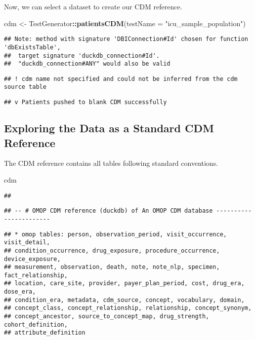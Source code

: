 \documentclass[
]{article}
\newenvironment{Shaded}{\begin{snugshade}}{\end{snugshade}}
\newcommand{\AttributeTok}[1]{\textcolor[rgb]{0.13,0.29,0.53}{#1}}
\newcommand{\FunctionTok}[1]{\textcolor[rgb]{0.13,0.29,0.53}{\textbf{#1}}}
\newcommand{\NormalTok}[1]{#1}
\newcommand{\OtherTok}[1]{\textcolor[rgb]{0.56,0.35,0.01}{#1}}
\newcommand{\SpecialCharTok}[1]{\textcolor[rgb]{0.81,0.36,0.00}{\textbf{#1}}}
\newcommand{\StringTok}[1]{\textcolor[rgb]{0.31,0.60,0.02}{#1}}
\begin{document}
Now, we can select a dataset to create our CDM reference.

\begin{Shaded}
\begin{Highlighting}[]
\NormalTok{cdm }\OtherTok{\textless{}{-}}\NormalTok{ TestGenerator}\SpecialCharTok{::}\FunctionTok{patientsCDM}\NormalTok{(}\AttributeTok{testName =} \StringTok{"icu\_sample\_population"}\NormalTok{)}
\end{Highlighting}
\end{Shaded}

\begin{verbatim}
## Note: method with signature 'DBIConnection#Id' chosen for function 'dbExistsTable',
##  target signature 'duckdb_connection#Id'.
##  "duckdb_connection#ANY" would also be valid
\end{verbatim}

\begin{verbatim}
## ! cdm name not specified and could not be inferred from the cdm source table
\end{verbatim}

\begin{verbatim}
## v Patients pushed to blank CDM successfully
\end{verbatim}

\subsection{Exploring the Data as a Standard CDM
Reference}\label{exploring-the-data-as-a-standard-cdm-reference}

The CDM reference contains all tables following standard conventions.

\begin{Shaded}
\begin{Highlighting}[]
\NormalTok{cdm}
\end{Highlighting}
\end{Shaded}

\begin{verbatim}
## 
\end{verbatim}

\begin{verbatim}
## -- # OMOP CDM reference (duckdb) of An OMOP CDM database -----------------------
\end{verbatim}

\begin{verbatim}
## * omop tables: person, observation_period, visit_occurrence, visit_detail,
## condition_occurrence, drug_exposure, procedure_occurrence, device_exposure,
## measurement, observation, death, note, note_nlp, specimen, fact_relationship,
## location, care_site, provider, payer_plan_period, cost, drug_era, dose_era,
## condition_era, metadata, cdm_source, concept, vocabulary, domain,
## concept_class, concept_relationship, relationship, concept_synonym,
## concept_ancestor, source_to_concept_map, drug_strength, cohort_definition,
## attribute_definition
\end{verbatim}
\end{document}
